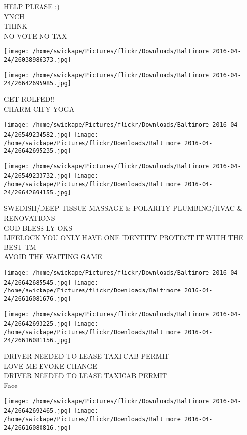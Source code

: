 \documentclass[10pt,letterpaper]{article}
\begin{document}
HELP PLEASE :)\\
YNCH\\
THINK\\
NO VOTE NO TAX\\
\pagebreak

\texttt{[image: /home/swickape/Pictures/flickr/Downloads/Baltimore 2016-04-24/26038986373.jpg]}

\vspace{0.25in}
\texttt{[image: /home/swickape/Pictures/flickr/Downloads/Baltimore 2016-04-24/26642695985.jpg]}

GET ROLFED!!\\
CHARM CITY YOGA\\
\pagebreak

\texttt{[image: /home/swickape/Pictures/flickr/Downloads/Baltimore 2016-04-24/26549234582.jpg]}
\texttt{[image: /home/swickape/Pictures/flickr/Downloads/Baltimore 2016-04-24/26642695235.jpg]}

\texttt{[image: /home/swickape/Pictures/flickr/Downloads/Baltimore 2016-04-24/26549233732.jpg]}
\texttt{[image: /home/swickape/Pictures/flickr/Downloads/Baltimore 2016-04-24/26642694155.jpg]}

SWEDISH/DEEP TISSUE MASSAGE \& POLARITY PLUMBING/HVAC \& RENOVATIONS\\
GOD BLESS LY OKS\\
LIFELOCK YOU ONLY HAVE ONE IDENTITY PROTECT IT WITH THE BEST TM\\
AVOID THE WAITING GAME\\
\pagebreak

\texttt{[image: /home/swickape/Pictures/flickr/Downloads/Baltimore 2016-04-24/26642685545.jpg]}
\texttt{[image: /home/swickape/Pictures/flickr/Downloads/Baltimore 2016-04-24/26616081676.jpg]}

\texttt{[image: /home/swickape/Pictures/flickr/Downloads/Baltimore 2016-04-24/26642693225.jpg]}
\texttt{[image: /home/swickape/Pictures/flickr/Downloads/Baltimore 2016-04-24/26616081156.jpg]}

DRIVER NEEDED TO LEASE TAXI CAB PERMIT\\
LOVE ME EVOKE CHANGE\\
DRIVER NEEDED TO LEASE TAXICAB PERMIT\\
Face\\
\pagebreak

\texttt{[image: /home/swickape/Pictures/flickr/Downloads/Baltimore 2016-04-24/26642692465.jpg]}
\texttt{[image: /home/swickape/Pictures/flickr/Downloads/Baltimore 2016-04-24/26616080816.jpg]}
\end{document}
